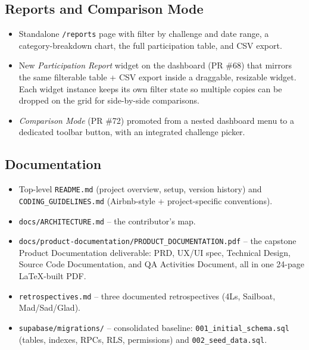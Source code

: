 \documentclass[11pt,letterpaper]{article}
\begin{document}
\subsection{Reports and Comparison Mode}

\begin{itemize}[noitemsep]
  \item Standalone \texttt{/reports} page with filter by challenge
        and date range, a category-breakdown chart, the full
        participation table, and CSV export.
  \item New \emph{Participation Report} widget on the dashboard
        (PR \#68) that mirrors the same filterable table + CSV
        export inside a draggable, resizable widget. Each widget
        instance keeps its own filter state so multiple copies can
        be dropped on the grid for side-by-side comparisons.
  \item \emph{Comparison Mode} (PR \#72) promoted from a nested
        dashboard menu to a dedicated toolbar button, with an
        integrated challenge picker.
\end{itemize}

\subsection{Documentation}

\begin{itemize}[noitemsep]
  \item Top-level \texttt{README.md} (project overview, setup,
        version history) and \texttt{CODING\_GUIDELINES.md}
        (Airbnb-style + project-specific conventions).
  \item \texttt{docs/ARCHITECTURE.md} -- the contributor's map.
  \item \texttt{docs/product-documentation/PRODUCT\_DOCUMENTATION.pdf}
        -- the capstone Product Documentation deliverable: PRD,
        UX/UI spec, Technical Design, Source Code Documentation,
        and QA Activities Document, all in one 24-page LaTeX-built PDF.
  \item \texttt{retrospectives.md} -- three documented
        retrospectives (4Ls, Sailboat, Mad/Sad/Glad).
  \item \texttt{supabase/migrations/} -- consolidated baseline:
        \texttt{001\_initial\_schema.sql} (tables, indexes, RPCs,
        RLS, permissions) and \texttt{002\_seed\_data.sql}.
\end{itemize}

\newpage
\end{document}
